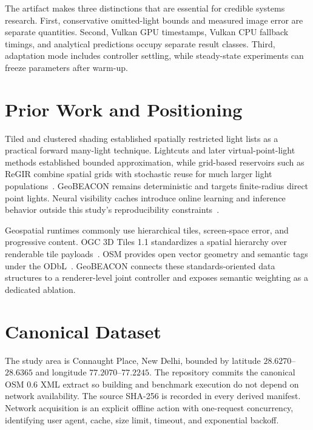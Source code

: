 \documentclass[10pt,twocolumn]{article}
\begin{document}
The artifact makes three distinctions that are essential for credible systems research. First,
conservative omitted-light bounds and measured image error are separate quantities. Second, Vulkan
GPU timestamps, Vulkan CPU fallback timings, and analytical predictions occupy separate result
classes. Third, adaptation mode includes controller settling, while steady-state experiments can
freeze parameters after warm-up.

\clearpage
\section{Prior Work and Positioning}
Tiled and clustered shading established spatially restricted light lists as a practical forward
many-light technique. Lightcuts and later virtual-point-light methods established bounded
approximation, while grid-based reservoirs such as ReGIR combine spatial grids with stochastic
reuse for much larger light populations~\cite{vpl,regir}. GeoBEACON remains deterministic and
targets finite-radius direct point lights. Neural visibility caches introduce online learning and
inference behavior outside this study's reproducibility constraints~\cite{nvc}.

Geospatial runtimes commonly use hierarchical tiles, screen-space error, and progressive content.
OGC 3D Tiles 1.1 standardizes a spatial hierarchy over renderable tile payloads~\cite{tiles}. OSM
provides open vector geometry and semantic tags under the ODbL~\cite{osm}. GeoBEACON connects these
standards-oriented data structures to a renderer-level joint controller and exposes semantic
weighting as a dedicated ablation.

\section{Canonical Dataset}
The study area is Connaught Place, New Delhi, bounded by latitude $28.6270$--$28.6365$ and longitude
$77.2070$--$77.2245$. The repository commits the canonical OSM 0.6 XML extract so building and
benchmark execution do not depend on network availability. The source SHA-256 is recorded in every
derived manifest. Network acquisition is an explicit offline action with one-request concurrency,
identifying user agent, cache, size limit, timeout, and exponential backoff.
\end{document}
